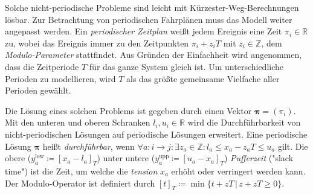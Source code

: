 \documentclass[a4paper, 11pt, twocolumn]{scrartcl}
\newcommand{\R}{\ensuremath{\mathbb{R}}}
\newcommand{\Z}{\ensuremath{\mathbb{Z}}}
\renewcommand{\vec}[1]{\mathbf{#1}}
\begin{document}
		Solche nicht-periodische Probleme sind leicht mit Kürzester-Weg-Berechnungen lösbar. Zur Betrachtung von periodischen Fahrplänen muss das Modell weiter angepasst werden. Ein \emph{periodischer Zeitplan} weißt jedem Ereignis eine Zeit \( \pi_i \in \R \) zu, wobei das Ereignis immer zu den Zeitpunkten \( \pi_i + z_i T \) mit \( z_i \in \Z \), dem \emph{Modulo-Parameter} stattfindet. Aus Gründen der Einfachheit wird angenommen, dass die Zeitperiode \(T\) für das ganze System gleich ist. Um unterschiedliche Perioden zu modellieren, wird \(T\) als das größte gemeinsame Vielfache aller Perioden gewählt.
		
		Die Lösung eines solchen Problems ist gegeben durch einen Vektor \( \vec{\pi} = (\pi_i) \). Mit den unteren und oberen Schranken \( l_i, u_i \in \R \) wird die Durchführbarkeit von nicht-periodischen Lösungen auf periodische Lösungen erweitert. Eine periodische Lösung \( \vec{\pi} \) heißt \emph{durchführbar}, wenn \( \forall a : i \to j : \exists z_a \in \Z : l_a \leq x_a - z_a T \leq u_a \) gilt. Die obere (\( y_a^\text{low} \coloneqq [x_a - l_a]_T \)) unter untere (\( y_a^\text{upp} \coloneqq [u_a - x_a]_T \)) \emph{Pufferzeit} ("slack time") ist die Zeit, um welche die \emph{tension} \(x_a\) erhöht oder verringert werden kann. Der Modulo-Operator ist definiert durch \( [t]_T \coloneqq \min \big\{ t + zT \,\vert\, z + zT \geq 0 \big\} \).
		


	
\end{document}
